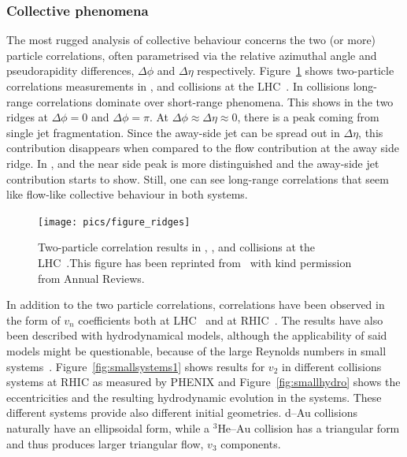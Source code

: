 
\subsubsection{Collective phenomena}
The most rugged analysis of collective behaviour concerns the two (or more) particle correlations, often parametrised via the relative azimuthal angle and pseudorapidity differences, $\Delta \phi$ and $\Delta \eta$ respectively. Figure~\ref{fig:smallsystems2} shows two-particle correlations measurements in \PbPb, \pPb and \pp collisions at the LHC~\cite{Aad:2015gqa}. In \PbPb collisions long-range correlations dominate over short-range phenomena. This shows in the two ridges at $\Delta \phi = 0 $ and $\Delta \phi = \pi$. At $\Delta\phi\approx\Delta\eta\approx0$, there is a peak coming from single jet fragmentation. Since the away-side jet can be spread out in $\Delta\eta$, this contribution disappears when compared to the flow contribution at the away side ridge. In \pPb, and \pp the near side peak is more distinguished and the away-side jet contribution starts to show. Still, one can see long-range correlations that seem like flow-like collective behaviour in both systems. 
\begin{figure}[b!]
\centering
            	\texttt{[image: pics/figure\_ridges]}
                \caption{Two-particle correlation results in \PbPb, \pPb, and \pp collisions at the LHC~\cite{Aad:2015gqa}.This figure has been reprinted from~\cite{Nagle:2018nvi} with kind permission from Annual Reviews. }
	\label{fig:smallsystems2}
\end{figure}

In addition to the two particle correlations, correlations have been observed in the form of $v_n$ coefficients both at LHC~\cite{Acharya:2017ino} and at RHIC~\cite{Aidala:2016vgl}. The results have also been described  with hydrodynamical models, although the applicability of said models might be questionable, because of the large Reynolds numbers in small systems~\cite{Shen:2016zpp,Niemi:2014wta}. Figure~\ref{fig:smallsystems1} shows results for $v_2$ in different collisions systems at RHIC as measured by PHENIX and Figure~\ref{fig:smallhydro} shows the eccentricities and the resulting hydrodynamic evolution in the systems. These different systems provide also different initial geometries. d--Au collisions naturally have an ellipsoidal form, while a $^3\mbox{He--Au}$ collision has a triangular form and thus produces larger triangular flow, $v_3$ components. 

